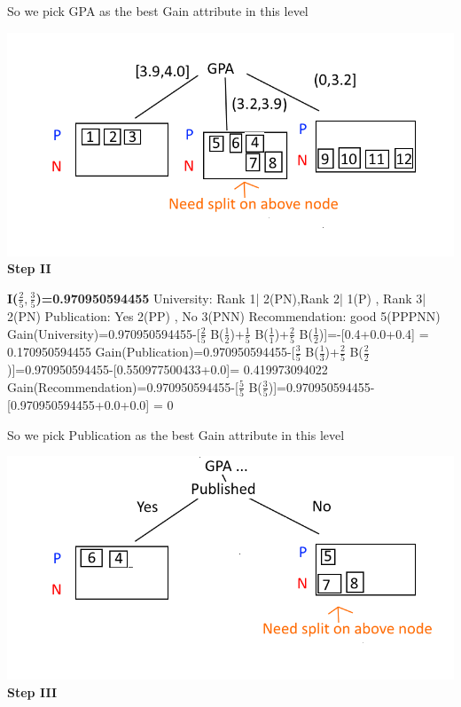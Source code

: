 \documentclass[12pt, letterpaper]{article}
\begin{document}
So we pick GPA as the best Gain attribute in this level

\includegraphics[scale=0.8]{"problem-2-step1"}
\textbf{Step II}

\textbf{I($\frac{2}{5},\frac{3}{5}$)=0.970950594455}\newline
University: Rank 1| 2(PN),Rank 2| 1(P) , Rank 3| 2(PN)\newline
Publication: Yes 2(PP) , No 3(PNN)\newline
Recommendation: good 5(PPPNN)\newline\newline
Gain(University)=0.970950594455-[$\frac{2}{5}$ B($\frac{1}{2}$)+$\frac{1}{5}$ B($\frac{1}{1}$)+$\frac{2}{5}$ B($\frac{1}{2}$)]=-[0.4+0.0+0.4]
= 0.170950594455\newline\newline
Gain(Publication)=0.970950594455-[$\frac{3}{5}$ B($\frac{1}{3}$)+$\frac{2}{5}$ B($\frac{2}{2}$)]=0.970950594455-[0.550977500433+0.0]=
0.419973094022\newline\newline
Gain(Recommendation)=0.970950594455-[$\frac{5}{5}$ B($\frac{3}{5}$)]=0.970950594455-[0.970950594455+0.0+0.0]
= 0\newline

So we pick Publication as the best Gain attribute in this level

\includegraphics[scale=0.8]{"problem-2-step2"}
\textbf{Step III}
\end{document}
